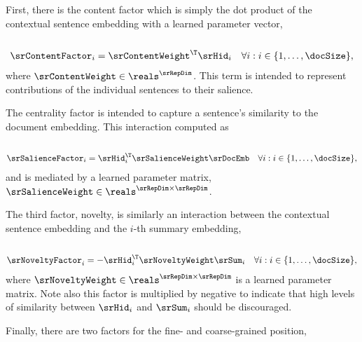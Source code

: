 First, there is the content factor which is simply the dot product of the
contextual sentence embedding with a learned parameter vector,\\

\noindent{}\\[-40pt]
\begin{align}
    \srContentFactor_i &={\srContentWeight}^\T \srHid_i & \forall i : i \in \{1,\ldots,\docSize\}, 
\end{align}
where $\srContentWeight \in \reals^{\srRepDim}$. This term is intended to
represent contributions of the individual sentences to their salience.

The centrality factor is intended to capture a sentence's similarity to the
document embedding. This interaction computed as\\

\noindent{}\\[-40pt]
\begin{align}
    \srSalienceFactor_i & = \srHid_i^\T\srSalienceWeight \srDocEmb & \forall i : i \in \{1,\ldots,\docSize\}, 
\end{align}
and is mediated by a learned parameter matrix, $\srSalienceWeight \in \reals^{\srRepDim \times \srRepDim}$.

The third factor, novelty, is similarly an interaction between the contextual
sentence embedding and the $i$-th summary embedding,\\

\noindent{}\\[-40pt]
\begin{align}
    \srNoveltyFactor_i &= -\srHid_i^\T \srNoveltyWeight \srSum_i
    & \forall i : i \in \{1,\ldots,\docSize\},
    \label{eq:srnov} 
\end{align}
where $\srNoveltyWeight \in \reals^{\srRepDim \times \srRepDim}$ is a learned
parameter matrix. Note also this factor is multiplied by negative to indicate
that high levels of similarity between $\srHid_i$ and $\srSum_i$ should be
discouraged. 



Finally, there are two factors for the fine- and coarse-grained position,\\

